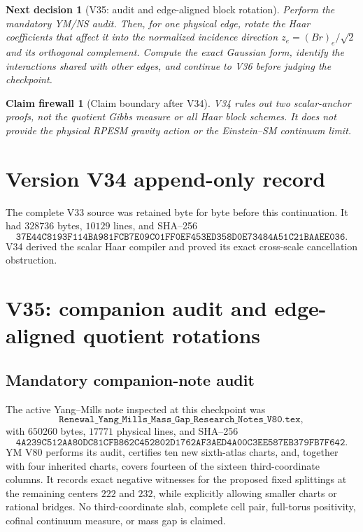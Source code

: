 \documentclass[11pt]{article}
\newtheorem{firewall}[theorem]{Claim firewall}
\newtheorem{decision}[theorem]{Next decision}
\theoremstyle{remark}
\begin{document}
\begin{decision}[V35: audit and edge-aligned block rotation]
\label{dec:v17v34-next}
Perform the mandatory YM/NS audit.  Then, for one physical edge, rotate
the Haar coefficients that affect it into the normalized incidence
direction \(z_e=(Br)_e/\sqrt2\) and its orthogonal complement.  Compute
the exact Gaussian form, identify the interactions shared with other
edges, and continue to V36 before judging the checkpoint.
\end{decision}

\begin{firewall}[Claim boundary after V34]
\label{fire:v17v34}
V34 rules out two scalar-anchor proofs, not the quotient Gibbs measure
or all Haar block schemes.  It does not provide the physical RPESM
gravity action or the Einstein--SM continuum limit.
\end{firewall}

\section*{Version V34 append-only record}
The complete V33 source was retained byte for byte before this
continuation.  It had \(328736\) bytes, \(10129\) lines, and SHA--256
\[
 \texttt{37E44C8193F114BA981FCB7E09C01FF0EF453ED358D0E73484A51C21BAAEE036}.
\]
V34 derived the scalar Haar compiler and proved its exact cross-scale
cancellation obstruction.


\section{V35: companion audit and edge-aligned quotient rotations}
\label{sec:v17v35}

\subsection{Mandatory companion-note audit}

The active Yang--Mills note inspected at this checkpoint was
\[
 \texttt{Renewal\_Yang\_Mills\_Mass\_Gap\_Research\_Notes\_V80.tex},
                                                               \tag{35.1}
\]
with \(650260\) bytes, \(17771\) physical lines, and SHA--256
\[
 \texttt{4A239C512AA80DC81CFB862C452802D1762AF3AED4A00C3EE587EB379FB7F642}.
                                                               \tag{35.2}
\]
YM V80 performs its audit, certifies ten new sixth-atlas charts, and,
together with four inherited charts, covers fourteen of the sixteen
third-coordinate columns.  It records exact negative witnesses for the
proposed fixed splittings at the remaining centers \(222\) and \(232\),
while explicitly allowing smaller charts or rational bridges.  No
third-coordinate slab, complete cell pair, full-torus positivity,
cofinal continuum measure, or mass gap is claimed.
\end{document}
